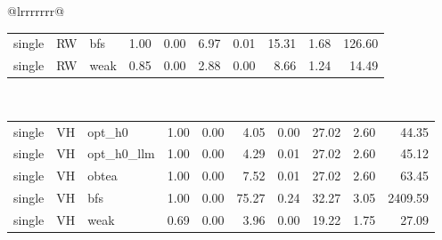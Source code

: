 \begin{table}[ht]
\begin{tabular}{@{}lrrrrrrr@{}}
\begin{tabular}{lllrrrrrrr}
single & RW & bfs & 1.00 & 0.00 & 6.97 & 0.01 & 15.31 & 1.68 & 126.60 \\
single & RW & weak & 0.85 & 0.00 & 2.88 & 0.00 & 8.66 & 1.24 & 14.49 \\
\bottomrule
\end{tabular}
\midrule
{} \\
\begin{tabular}{lllrrrrrrr}
\toprule
\midrule
single & VH & opt_h0 & 1.00 & 0.00 & 4.05 & 0.00 & 27.02 & 2.60 & 44.35 \\
single & VH & opt_h0_llm & 1.00 & 0.00 & 4.29 & 0.01 & 27.02 & 2.60 & 45.12 \\
single & VH & obtea & 1.00 & 0.00 & 7.52 & 0.01 & 27.02 & 2.60 & 63.45 \\
single & VH & bfs & 1.00 & 0.00 & 75.27 & 0.24 & 32.27 & 3.05 & 2409.59 \\
single & VH & weak & 0.69 & 0.00 & 3.96 & 0.00 & 19.22 & 1.75 & 27.09 \\
\bottomrule
\end{tabular}
\midrule
\bottomrule
\end{tabular}
\end{table}
\clearpage
